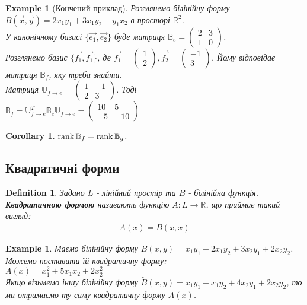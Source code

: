 \documentclass[a4paper, 10pt]{article}
\theoremstyle{theoremdd}
\theoremstyle{theoremdd}
\newtheorem{definition}[theorem]{Definition}
\theoremstyle{theoremdd}
\theoremstyle{theoremdd}
\newtheorem{example}[theorem]{Example}
\theoremstyle{theoremdd}
\theoremstyle{theoremdd}
\theoremstyle{theoremdd}
\theoremstyle{theoremdd}
\newtheorem{corollary}[theorem]{Corollary}
\begin{document}
\begin{example}[Кончений приклад]
Розглянемо білінійну форму $B(\vec{x},\vec{y}) = 2x_1y_1 + 3x_1y_2 + y_1x_2$ в просторі $\mathbb{R}^2$.\\
У канонічному базисі $\{\vec{e_1},\vec{e_2}\}$ буде матриця $\mathbb{B}_e = \begin{pmatrix}
2 & 3 \\
1 & 0
\end{pmatrix}$.\\
Розглянемо базис $\{ \vec{f_1}, \vec{f_1} \}$, де $\vec{f_1} = \begin{pmatrix}
1 \\ 2
\end{pmatrix}, \vec{f_2} = \begin{pmatrix}
-1 \\ 3
\end{pmatrix}$. Йому відповідає матриця $\mathbb{B}_f$, яку треба знайти.\\
Матриця $\mathbb{U}_{f \to e} = \begin{pmatrix}
1 & -1 \\
2 & 3
\end{pmatrix}$. Тоді\\
$\mathbb{B}_f = \mathbb{U}^T_{f \to e} \mathbb{B}_e \mathbb{U}_{f \to e} = \begin{pmatrix}
10 & 5 \\
-5 & -10
\end{pmatrix}$
\end{example}

\begin{corollary}
$\rank \mathbb{B}_f = \rank \mathbb{B}_g$.
\end{corollary}

\subsection{Квадратичні форми}
\begin{definition}
Задано $L$ - лінійний простір та $B$ - білінійна функція.\\
\textbf{Квадратичною формою} називають функцію $A: L \to \mathbb{R}$, що приймає такий вигляд:
\begin{align*}
A(x) = B(x,x)
\end{align*}
\end{definition}

\begin{example}
Маємо білінійну форму $B(x,y) = x_1y_1 + 2x_1y_2 + 3x_2y_1 + 2x_2y_2$. Можемо поставити їй квадратичну форму:\\
$A(x) = x_1^2 + 5x_1x_2 + 2x_2^2$
\bigskip \\
Якщо візьмемо іншу білінійну форму $\tilde{B}(x,y) = x_1y_1 + x_1y_2 + 4x_2y_1 + 2x_2y_2$, то ми отримаємо ту саму квадратичну форму $A(x)$.
\end{example}
\end{document}
